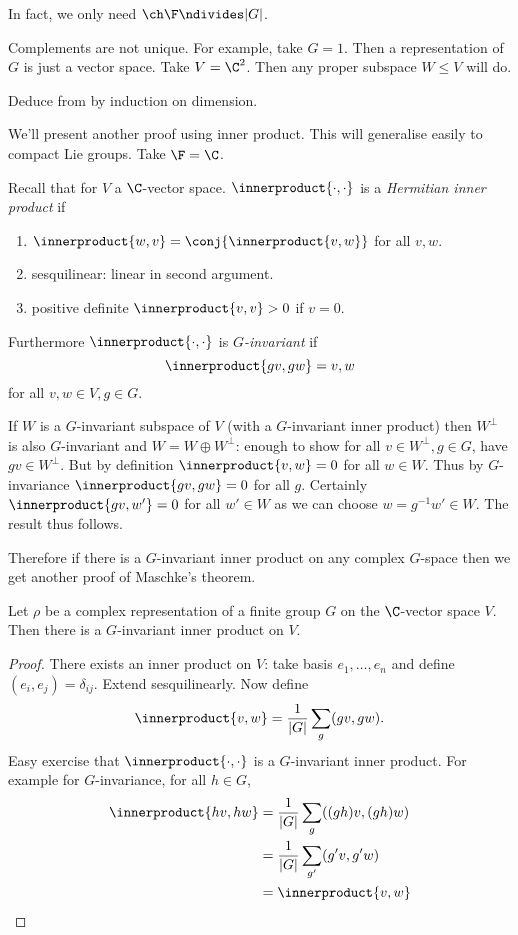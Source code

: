 \documentclass[a4paper]{article}
\newcommand*{\ip}{\innerproduct} %
\begin{document}
In fact, we only need \(\ch \F \ndivides |G|\).

\begin{remark}
  Complements are not unique. For example, take \(G = 1\). Then a representation of \(G\) is just a vector space. Take \(V = \C^2\). Then any proper subspace \(W \leq V\) will do.
\end{remark}

\begin{ex}
  Deduce  from  by induction on dimension.
\end{ex}

We'll present another proof using inner product. This will generalise easily to compact Lie groups. Take \(\F = \C\).

Recall that for \(V\) a \(\C\)-vector space. \(\ip{\cdot, \cdot}\) is a \emph{Hermitian inner product} if
\begin{enumerate}
\item \(\ip{w, v} = \conj{\ip{v, w}}\) for all \(v, w\).
\item sesquilinear: linear in second argument.
\item positive definite \(\ip{v, v} > 0\) if \(v = 0\).
\end{enumerate}
Furthermore \(\ip{\cdot, \cdot}\) is \emph{\(G\)-invariant} if
\[
  \ip{gv, gw} = {v, w}
\]
for all \(v, w \in V, g \in G\).

If \(W\) is a \(G\)-invariant subspace of \(V\) (with a \(G\)-invariant inner product) then \(W^\perp\) is also \(G\)-invariant and \(W = W \oplus W^\perp\): enough to show for all \(v \in W^\perp, g \in G\), have \(gv \in W^\perp\). But by definition \(\ip{v, w} = 0\) for all \(w \in W\). Thus by \(G\)-invariance \(\ip{gv, gw} = 0\) for all \(g\). Certainly \(\ip{gv, w'} = 0\) for all \(w' \in W\) as we can choose \(w = g^{-1}w' \in W\). The result thus follows.

Therefore if there is a \(G\)-invariant inner product on any complex \(G\)-space then we get another proof of Maschke's theorem.

\begin{lemma}
  Let \(\rho\) be a complex representation of a finite group \(G\) on the \(\C\)-vector space \(V\). Then there is a \(G\)-invariant inner product on \(V\).
\end{lemma}

\begin{proof}
  There exists an inner product on \(V\): take basis \(e_1, \dots, e_n\) and define \((e_i, e_j) = \delta_{ij}\). Extend sesquilinearly. Now define
  \[
    \ip{v, w} = \frac{1}{|G|} \sum_g (gv, gw).
  \]
  Easy exercise that \(\ip{\cdot, \cdot}\) is a \(G\)-invariant inner product. For example for \(G\)-invariance, for all \(h \in G\),
  \begin{align*}
    \ip{hv, hw}
    &= \frac{1}{|G|} \sum_g ((gh)v, (gh)w) \\
    &= \frac{1}{|G|} \sum_{g'} (g'v, g'w) \\
    &= \ip{v, w}
  \end{align*}
\end{proof}
\end{document}
